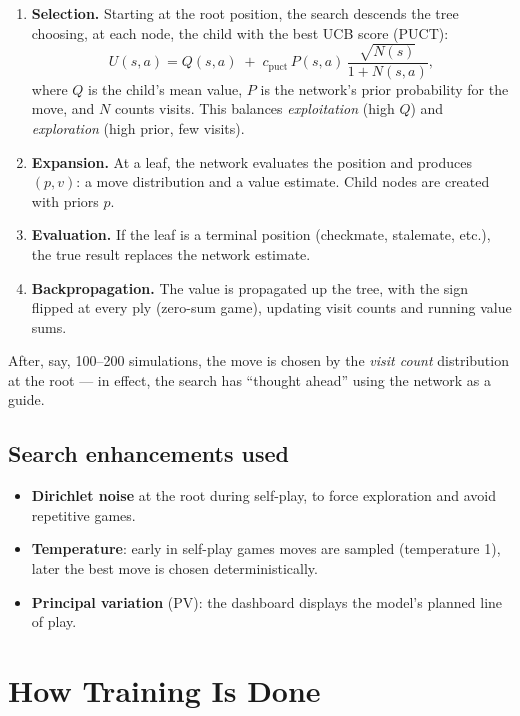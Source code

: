 \documentclass[11pt,a4paper]{article}
\begin{document}
\begin{enumerate}
  \item \textbf{Selection.} Starting at the root position, the search descends
        the tree choosing, at each node, the child with the best UCB score
        (PUCT):
        \[
        U(s,a)=Q(s,a)\;+\;c_{\mathrm{puct}}\,
        P(s,a)\,\frac{\sqrt{N(s)}}{1+N(s,a)},
        \]
        where $Q$ is the child's mean value, $P$ is the network's prior
        probability for the move, and $N$ counts visits. This balances
        \emph{exploitation} (high $Q$) and \emph{exploration} (high prior,
        few visits).
  \item \textbf{Expansion.} At a leaf, the network evaluates the position and
        produces $(p,v)$: a move distribution and a value estimate. Child nodes
        are created with priors $p$.
  \item \textbf{Evaluation.} If the leaf is a terminal position (checkmate,
        stalemate, etc.), the true result replaces the network estimate.
  \item \textbf{Backpropagation.} The value is propagated up the tree, with the
        sign flipped at every ply (zero-sum game), updating visit counts and
        running value sums.
\end{enumerate}

After, say, 100--200 simulations, the move is chosen by the \emph{visit count}
distribution at the root --- in effect, the search has ``thought ahead'' using
the network as a guide.

\subsection{Search enhancements used}
\begin{itemize}
  \item \textbf{Dirichlet noise} at the root during self-play, to force
        exploration and avoid repetitive games.
  \item \textbf{Temperature}: early in self-play games moves are sampled
        (temperature 1), later the best move is chosen deterministically.
  \item \textbf{Principal variation} (PV): the dashboard displays the model's
        planned line of play.
\end{itemize}

\section{How Training Is Done}
\end{document}
